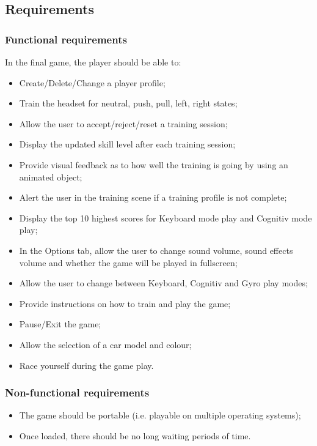 \subsection{Requirements}

\subsubsection{Functional requirements}
In the final game, the player should be able to: 
\begin{itemize}
	\item Create/Delete/Change a player profile;
	\item Train the headset for neutral, push, pull, left, right states;
	\item Allow the user to accept/reject/reset a training session;
	\item Display the updated skill level after each training session;
	\item Provide visual feedback as to how well the training is going by using an animated object;
	\item Alert the user in the training scene if a training profile is not complete;
	\item Display the top 10 highest scores for Keyboard mode play and Cognitiv mode play;
	\item In the Options tab, allow the user to change sound volume, sound effects volume and whether the game will be played in fullscreen;
	\item Allow the user to change between Keyboard, Cognitiv and Gyro play modes;
	\item Provide instructions on how to train and play the game;
	\item Pause/Exit the game;
	\item Allow the selection of a car model and colour;
	\item Race yourself during the game play.
\end{itemize}

\subsubsection{Non-functional requirements}
\begin{itemize}
	\item The game should be portable (i.e. playable on multiple operating systems);
	\item Once loaded, there should be no long waiting periods of time.
\end{itemize}

